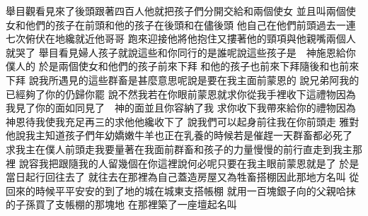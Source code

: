 \bchapter%
舉目觀看\chientien 見來了\chientien 後頭跟著四百人\yuentien 他就把孩子們分開交給\chientien{}\chientien 和兩個使女\yuentien 
{}並且叫兩個使女和他們的孩子在前頭\chientien{}和他的孩子在後頭\chientien{}和在儘後頭\chuan 
{}他自己在他們前頭過去\chientien 一連七次俯伏在地\chientien 纔就近他哥哥\chuan 
{}跑來迎接他\chientien 將他抱住\chientien 又摟著他的頸項與他親嘴\chientien 兩個人就哭了\chuan 
{}舉目看見婦人孩子\chientien 就說\chientien 這些和你同行的是誰呢\yuentien{}說\chientien 這些孩子是　神施恩給你僕人的\chuan 
{}於是兩個使女和他們的孩子前來下拜\chuan 
{}和他的孩子也前來下拜\yuentien 隨後和也前來下拜\chuan 
{}說\chientien 我所遇見的這些群畜是甚麼意思呢\yuentien{}說\chientien 是要在我主面前蒙恩的\chuan 
{}說\chientien 兄弟阿\chientien 我的已經夠了\chientien 你的仍歸你罷\chuan 
{}說\chientien 不然\chientien 我若在你眼前蒙恩\chientien 就求你從我手裡收下這禮物\chientien 因為我見了你的面\chientien 如同見了　神的面\chientien 並且你容納了我\chuan 
{}求你收下我帶來給你的禮物\chientien 因為　神恩待我\chientien 使我充足\yuentien{}再三的求他\chientien 他纔收下了\chuan 
{}說\chientien 我們可以起身前往\chientien 我在你前頭走\yuentien 
{}雅對他說\chientien 我主知道孩子們年幼嬌嫩\chientien 牛羊也正在乳養的時候\chientien 若是催趕一天\chientien 群畜都必死了\chuan 
{}求我主在僕人前頭走\yuentien 我要量著在我面前群畜和孩子的力量慢慢的前行\chientien 直走到我主那裡\chuan 
{}說\chientien 容我把跟隨我的人留幾個在你這裡\yuentien{}說\chientien 何必呢\chientien 只要在我主眼前蒙恩就是了\chuan 
{}於是當日起行\chientien 回往去了\chuan 
{}就往去\chientien 在那裡為自己蓋造房屋\chientien 又為牲畜搭棚\yuentien 因此那地方名叫\chuan{}\linebreak{}\Chuan
{}從回來的時候\chientien 平平安安的到了地的城\chientien 在城東支搭帳棚\chuan 
{}就用一百塊銀子向的父親哈抹的子孫\chientien 買了支帳棚的那塊地\chuan 
{}在那裡築了一座壇\chientien 起名叫\chuan{}
